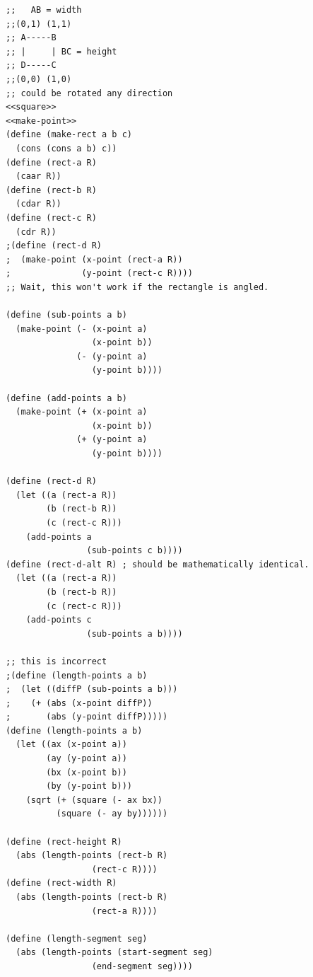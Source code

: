 \documentclass[final,fleqn,titlepage]{article}
\begin{document}
\begin{verbatim}
;;   AB = width
;;(0,1) (1,1)
;; A-----B
;; |     | BC = height
;; D-----C
;;(0,0) (1,0)
;; could be rotated any direction
<<square>>
<<make-point>>
(define (make-rect a b c)
  (cons (cons a b) c))
(define (rect-a R)
  (caar R))
(define (rect-b R)
  (cdar R))
(define (rect-c R)
  (cdr R))
;(define (rect-d R)
;  (make-point (x-point (rect-a R))
;              (y-point (rect-c R))))
;; Wait, this won't work if the rectangle is angled.

(define (sub-points a b)
  (make-point (- (x-point a)
                 (x-point b))
              (- (y-point a)
                 (y-point b))))

(define (add-points a b)
  (make-point (+ (x-point a)
                 (x-point b))
              (+ (y-point a)
                 (y-point b))))

(define (rect-d R)
  (let ((a (rect-a R))
        (b (rect-b R))
        (c (rect-c R)))
    (add-points a
                (sub-points c b))))
(define (rect-d-alt R) ; should be mathematically identical.
  (let ((a (rect-a R))
        (b (rect-b R))
        (c (rect-c R)))
    (add-points c
                (sub-points a b))))

;; this is incorrect
;(define (length-points a b)
;  (let ((diffP (sub-points a b)))
;    (+ (abs (x-point diffP))
;       (abs (y-point diffP)))))
(define (length-points a b)
  (let ((ax (x-point a))
        (ay (y-point a))
        (bx (x-point b))
        (by (y-point b)))
    (sqrt (+ (square (- ax bx))
          (square (- ay by))))))

(define (rect-height R)
  (abs (length-points (rect-b R)
                 (rect-c R))))
(define (rect-width R)
  (abs (length-points (rect-b R)
                 (rect-a R))))

(define (length-segment seg)
  (abs (length-points (start-segment seg)
                 (end-segment seg))))
\end{verbatim}
\end{document}

